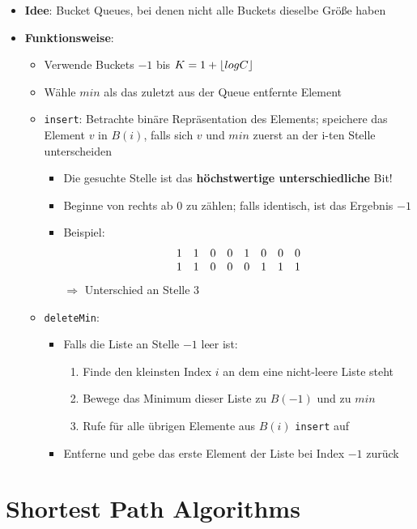 \documentclass[10pt,a4paper]{article}
\DeclarePairedDelimiter{\floor}{\lfloor}{\rfloor}
\begin{document}
  	\begin{itemize}
  		\item \textbf{Idee}: Bucket Queues, bei denen nicht alle Buckets dieselbe Größe haben
  		\item \textbf{Funktionsweise}:
  		\begin{itemize}
  			\item Verwende Buckets $-1$ bis $K = 1 + \floor{log C}$
  			\item Wähle $min$ als das zuletzt aus der Queue entfernte Element
  			\item \texttt{insert}: Betrachte binäre Repräsentation des Elements; speichere das Element $v$ in $B(i)$, falls sich $v$ und $min$ zuerst an der i-ten Stelle unterscheiden
  			\begin{itemize}
  				\item Die gesuchte Stelle ist das \textbf{höchstwertige unterschiedliche} Bit!
  				\item Beginne von rechts ab $0$ zu zählen; falls identisch, ist das Ergebnis $-1$
  				\item Beispiel: $$\begin{array}{c c c c c c c c}
  					1&1&0&0&1&0&0&0\\
  					1&1&0&0&0&1&1&1
  				\end{array}$$ $\Rightarrow$ Unterschied an Stelle $3$
  			\end{itemize}
  			\item \texttt{deleteMin}:
  			\begin{itemize}
  				\item Falls die Liste an Stelle $-1$ leer ist:
  				\begin{enumerate}
  					\item Finde den kleinsten Index $i$ an dem eine nicht-leere Liste steht
  					\item Bewege das Minimum dieser Liste zu $B(-1)$ und zu $min$
  					\item Rufe für alle übrigen Elemente aus $B(i)$ \texttt{insert} auf
  				\end{enumerate}
  				\item Entferne und gebe das erste Element der Liste bei Index $-1$ zurück
  			\end{itemize}
  		\end{itemize}
  	\end{itemize}

	\newpage
	\section{Shortest Path Algorithms}
	\label{sp:sec:shortest_path_algorithms}
	
\end{document}
